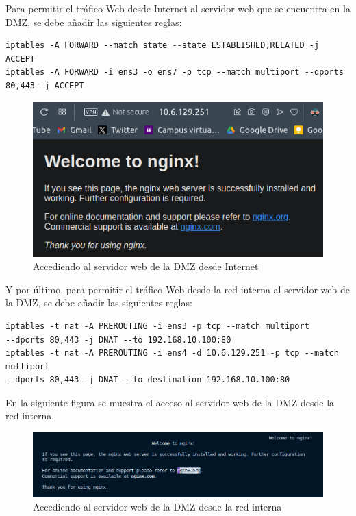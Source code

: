 \documentclass[11pt]{report} %
\begin{document}
Para permitir el tráfico Web desde Internet al servidor web que se encuentra en la DMZ, se debe añadir las siguientes reglas:
\begin{verbatim}
iptables -A FORWARD --match state --state ESTABLISHED,RELATED -j ACCEPT
iptables -A FORWARD -i ens3 -o ens7 -p tcp --match multiport --dports 80,443 -j ACCEPT
\end{verbatim}

\begin{figure}[H]
  \centering
  \includegraphics[scale=0.55]{img/nginx_navegador.png}
  \caption{Accediendo al servidor web de la DMZ desde Internet}
  \label{fig:permitir tráfico web desde Internet al servidor web que se encuentra en la DMZ}
\end{figure}

Y por último, para permitir el tráfico Web desde la red interna al servidor web de la DMZ, se debe añadir las siguientes reglas:
\begin{verbatim}
iptables -t nat -A PREROUTING -i ens3 -p tcp --match multiport 
--dports 80,443 -j DNAT --to 192.168.10.100:80 
iptables -t nat -A PREROUTING -i ens4 -d 10.6.129.251 -p tcp --match multiport 
--dports 80,443 -j DNAT --to-destination 192.168.10.100:80 
\end{verbatim}

\cleardoublepage

En la siguiente figura se muestra el acceso al servidor web de la DMZ desde la red interna.

\begin{figure}[H]
  \centering
  \includegraphics[scale=0.5]{img/nginx_cliente.png}
  \caption{Accediendo al servidor web de la DMZ desde la red interna}
  \label{fig:permitir tráfico web desde la red interna al servidor web de la DMZ}
\end{figure}
\end{document}
